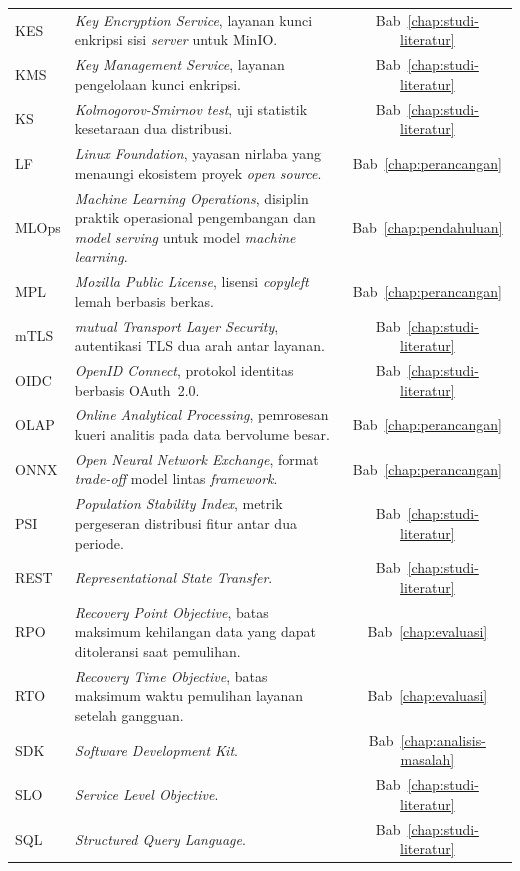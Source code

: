 \begin{longtable}{@{} l >{\raggedright\arraybackslash}p{8cm} c @{}}
KES & \textit{Key Encryption Service}, layanan kunci enkripsi sisi \textit{server} untuk MinIO. & Bab~\ref{chap:studi-literatur} \\
KMS & \textit{Key Management Service}, layanan pengelolaan kunci enkripsi. & Bab~\ref{chap:studi-literatur} \\
KS & \textit{Kolmogorov-Smirnov test}, uji statistik kesetaraan dua distribusi. & Bab~\ref{chap:studi-literatur} \\
LF & \textit{Linux Foundation}, yayasan nirlaba yang menaungi ekosistem proyek \textit{open source}. & Bab~\ref{chap:perancangan} \\
MLOps & \textit{Machine Learning Operations}, disiplin praktik operasional pengembangan dan \textit{model serving} untuk model \textit{machine learning}. & Bab~\ref{chap:pendahuluan} \\
MPL & \textit{Mozilla Public License}, lisensi \textit{copyleft} lemah berbasis berkas. & Bab~\ref{chap:perancangan} \\
mTLS & \textit{mutual Transport Layer Security}, autentikasi TLS dua arah antar layanan. & Bab~\ref{chap:studi-literatur} \\
OIDC & \textit{OpenID Connect}, protokol identitas berbasis OAuth~2.0. & Bab~\ref{chap:studi-literatur} \\
OLAP & \textit{Online Analytical Processing}, pemrosesan kueri analitis pada data bervolume besar. & Bab~\ref{chap:perancangan} \\
ONNX & \textit{Open Neural Network Exchange}, format \textit{trade-off} model lintas \textit{framework}. & Bab~\ref{chap:perancangan} \\
PSI & \textit{Population Stability Index}, metrik pergeseran distribusi fitur antar dua periode. & Bab~\ref{chap:studi-literatur} \\
REST & \textit{Representational State Transfer}. & Bab~\ref{chap:studi-literatur} \\
RPO & \textit{Recovery Point Objective}, batas maksimum kehilangan data yang dapat ditoleransi saat pemulihan. & Bab~\ref{chap:evaluasi} \\
RTO & \textit{Recovery Time Objective}, batas maksimum waktu pemulihan layanan setelah gangguan. & Bab~\ref{chap:evaluasi} \\
SDK & \textit{Software Development Kit}. & Bab~\ref{chap:analisis-masalah} \\
SLO & \textit{Service Level Objective}. & Bab~\ref{chap:studi-literatur} \\
SQL & \textit{Structured Query Language}. & Bab~\ref{chap:studi-literatur} \\

\end{longtable}
